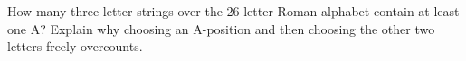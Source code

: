 How many three-letter strings over the 26-letter Roman alphabet contain at least one A? Explain why choosing an A-position and then choosing the other two letters freely overcounts.
